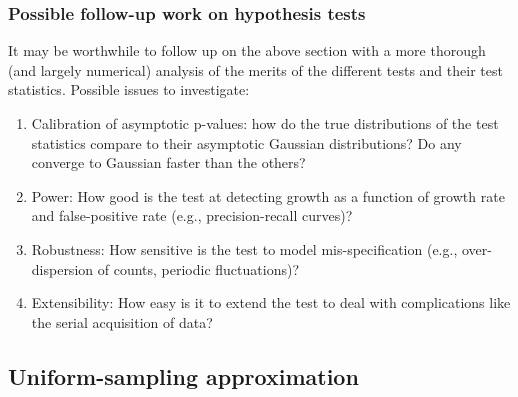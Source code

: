 \documentclass[12pt, letterpaper]{article}
\begin{document}
\subsubsection{Possible follow-up work on hypothesis tests}

It may be worthwhile to follow up on the above section with a more thorough (and largely numerical) analysis of the merits of the different tests and their test statistics.
Possible issues to investigate:
\begin{enumerate}
    \item Calibration of asymptotic p-values: how do the true distributions of the test statistics compare to their asymptotic Gaussian distributions? Do any converge to Gaussian faster than the others?
    \item Power: How good is the test at detecting growth as a function of growth rate and false-positive rate (e.g., precision-recall curves)?
    \item Robustness: How sensitive is the test to model mis-specification (e.g., over-dispersion of counts, periodic fluctuations)?
    \item Extensibility: How easy is it to extend the test to deal with complications like the serial acquisition of data?
\end{enumerate}

\subsection{Uniform-sampling approximation}
\end{document}
